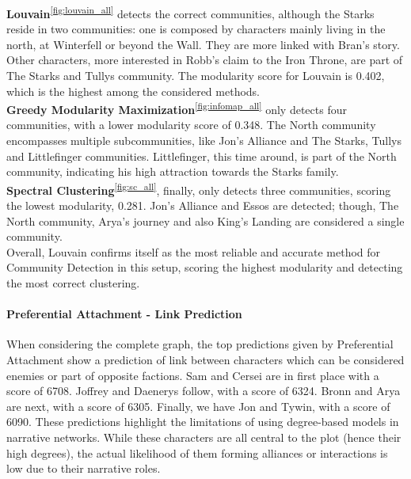 \documentclass[10pt,twocolumn,letterpaper]{article}
\begin{document}
\textbf{Louvain}\textsuperscript{\ref{fig:louvain_all}} detects the correct communities, although the Starks reside in two communities: one is composed by characters mainly living in the north, at Winterfell or beyond the Wall. They are more linked with Bran's story. Other characters, more interested in Robb's claim to the Iron Throne, are part of The Starks and Tullys community. The modularity score for Louvain is 0.402, which is the highest among the considered methods.\\

\textbf{Greedy Modularity Maximization}\textsuperscript{\ref{fig:infomap_all}} only detects four communities, with a lower modularity score of 0.348. The North community encompasses multiple subcommunities, like Jon's Alliance and The Starks, Tullys and Littlefinger communities. Littlefinger, this time around, is part of the North community, indicating his high attraction towards the Starks family. \\

\textbf{Spectral Clustering}\textsuperscript{\ref{fig:sc_all}}, finally, only detects three communities, scoring the lowest modularity, 0.281. Jon's Alliance and Essos are detected; though, The North community, Arya's journey and also King's Landing are considered a single community. \\

Overall, Louvain confirms itself as the most reliable and accurate method for Community Detection in this setup, scoring the highest modularity and detecting the most correct clustering.


\paragraph{Preferential Attachment - Link Prediction}

When considering the complete graph, the top predictions given by Preferential Attachment show a prediction of link between characters which can be considered enemies or part of opposite factions. Sam and Cersei are in first place with a score of 6708. Joffrey and Daenerys follow, with a score of 6324. Bronn and Arya are next, with a score of 6305. Finally, we have Jon and Tywin, with a score of 6090. These predictions highlight the limitations of using degree-based models in narrative networks. While these characters are all central to the plot (hence their high degrees), the actual likelihood of them forming alliances or interactions is low due to their narrative roles.
\end{document}
